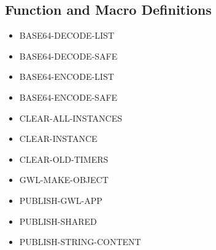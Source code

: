 \documentclass [11pt]{book}
\begin{document}
\subsection{Function and Macro Definitions}

\label{subsec:functionandmacrodefinitions}



\begin{itemize}

\item {}BASE64-DECODE-LIST





\item {}BASE64-DECODE-SAFE





\item {}BASE64-ENCODE-LIST





\item {}BASE64-ENCODE-SAFE





\item {}CLEAR-ALL-INSTANCES





\item {}CLEAR-INSTANCE





\item {}CLEAR-OLD-TIMERS





\item {}GWL-MAKE-OBJECT





\item {}PUBLISH-GWL-APP





\item {}PUBLISH-SHARED





\item {}PUBLISH-STRING-CONTENT






\end{itemize}
\end{document}
